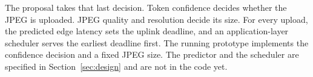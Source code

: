 The proposal takes that last decision. Token confidence decides whether the
JPEG is uploaded. JPEG quality and resolution decide its size. For every
upload, the predicted edge latency sets the uplink deadline, and an
application-layer scheduler serves the earliest deadline first. The running
prototype implements the confidence decision and a fixed JPEG size. The
predictor and the scheduler are specified in Section~\ref{sec:design} and
are not in the code yet.
